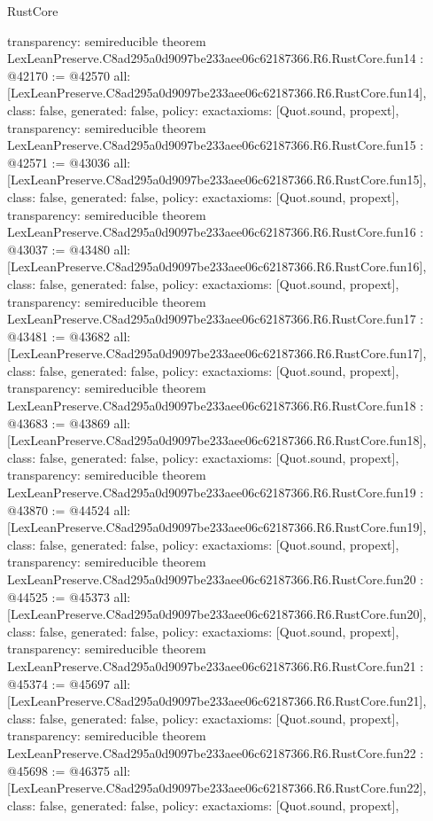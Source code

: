 \begin{lexlean}{RustCore}
\begin{coremodule}
{  transparency: semireducible
}
theorem LexLeanPreserve.C8ad295a0d9097be233aee06c62187366.R6.RustCore.fun14 : @42170 := @42570 {
  all: [LexLeanPreserve.C8ad295a0d9097be233aee06c62187366.R6.RustCore.fun14],
  class: false,
  generated: false,
  policy: exact{axioms: [Quot.sound, propext]},
  transparency: semireducible
}
theorem LexLeanPreserve.C8ad295a0d9097be233aee06c62187366.R6.RustCore.fun15 : @42571 := @43036 {
  all: [LexLeanPreserve.C8ad295a0d9097be233aee06c62187366.R6.RustCore.fun15],
  class: false,
  generated: false,
  policy: exact{axioms: [Quot.sound, propext]},
  transparency: semireducible
}
theorem LexLeanPreserve.C8ad295a0d9097be233aee06c62187366.R6.RustCore.fun16 : @43037 := @43480 {
  all: [LexLeanPreserve.C8ad295a0d9097be233aee06c62187366.R6.RustCore.fun16],
  class: false,
  generated: false,
  policy: exact{axioms: [Quot.sound, propext]},
  transparency: semireducible
}
theorem LexLeanPreserve.C8ad295a0d9097be233aee06c62187366.R6.RustCore.fun17 : @43481 := @43682 {
  all: [LexLeanPreserve.C8ad295a0d9097be233aee06c62187366.R6.RustCore.fun17],
  class: false,
  generated: false,
  policy: exact{axioms: [Quot.sound, propext]},
  transparency: semireducible
}
theorem LexLeanPreserve.C8ad295a0d9097be233aee06c62187366.R6.RustCore.fun18 : @43683 := @43869 {
  all: [LexLeanPreserve.C8ad295a0d9097be233aee06c62187366.R6.RustCore.fun18],
  class: false,
  generated: false,
  policy: exact{axioms: [Quot.sound, propext]},
  transparency: semireducible
}
theorem LexLeanPreserve.C8ad295a0d9097be233aee06c62187366.R6.RustCore.fun19 : @43870 := @44524 {
  all: [LexLeanPreserve.C8ad295a0d9097be233aee06c62187366.R6.RustCore.fun19],
  class: false,
  generated: false,
  policy: exact{axioms: [Quot.sound, propext]},
  transparency: semireducible
}
theorem LexLeanPreserve.C8ad295a0d9097be233aee06c62187366.R6.RustCore.fun20 : @44525 := @45373 {
  all: [LexLeanPreserve.C8ad295a0d9097be233aee06c62187366.R6.RustCore.fun20],
  class: false,
  generated: false,
  policy: exact{axioms: [Quot.sound, propext]},
  transparency: semireducible
}
theorem LexLeanPreserve.C8ad295a0d9097be233aee06c62187366.R6.RustCore.fun21 : @45374 := @45697 {
  all: [LexLeanPreserve.C8ad295a0d9097be233aee06c62187366.R6.RustCore.fun21],
  class: false,
  generated: false,
  policy: exact{axioms: [Quot.sound, propext]},
  transparency: semireducible
}
theorem LexLeanPreserve.C8ad295a0d9097be233aee06c62187366.R6.RustCore.fun22 : @45698 := @46375 {
  all: [LexLeanPreserve.C8ad295a0d9097be233aee06c62187366.R6.RustCore.fun22],
  class: false,
  generated: false,
  policy: exact{axioms: [Quot.sound, propext]},
}
\end{coremodule}
\end{lexlean}
